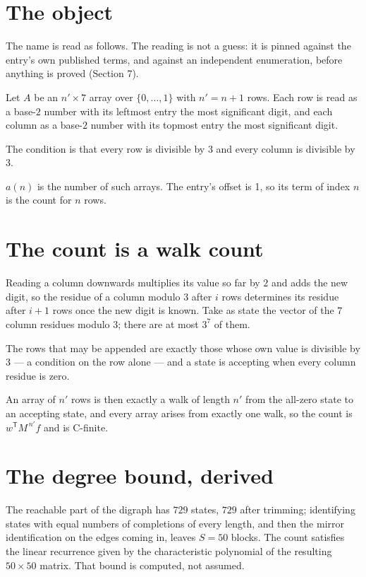 \documentclass[11pt]{article}
\theoremstyle{definition}
\begin{document}
\section{The object}

The name is read as follows. The reading is not a guess: it is pinned against the entry's own published terms, and against an independent enumeration, before anything is proved (Section 7).

Let $A$ be an $n' \times 7$ array over $\{0,\dots,1\}$ with $n' = n + 1$ rows. Each row is read as a base-$2$ number with its leftmost entry the most significant digit, and each column as a base-$2$ number with its topmost entry the most significant digit.

The condition is that every row is divisible by $3$ and every column is divisible by $3$.

$a(n)$ is the number of such arrays. The entry's offset is 1, so its term of index $n$ is the count for $n$ rows.

\section{The count is a walk count}

Reading a column downwards multiplies its value so far by $2$ and adds the new digit, so the residue of a column modulo $3$ after $i$ rows determines its residue after $i+1$ rows once the new digit is known. Take as state the vector of the $7$ column residues modulo $3$; there are at most $3^{7}$ of them.

The rows that may be appended are exactly those whose own value is divisible by $3$ --- a condition on the row alone --- and a state is accepting when every column residue is zero.

An array of $n'$ rows is then exactly a walk of length $n'$ from the all-zero state to an accepting state, and every array arises from exactly one walk, so the count is $w^{\mathsf T}M^{\,n'}f$ and is C-finite.

\section{The degree bound, derived}

The reachable part of the digraph has $729$ states, $729$ after trimming; identifying states with equal numbers of completions of every length, and then the mirror identification on the edges coming in, leaves $S = 50$ blocks. The count satisfies the linear recurrence given by the characteristic polynomial of the resulting $50\times50$ matrix. That bound is computed, not assumed.
\end{document}
